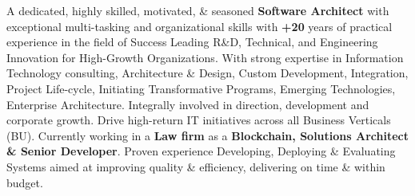\vspace{-4mm}
\begin{cvparagraph}

A dedicated, highly skilled, motivated, \& seasoned \textbf{Software Architect} with exceptional multi-tasking and organizational skills with \textbf{+20} years of practical experience in the field of Success Leading R\&D, Technical, and Engineering Innovation for High-Growth Organizations. With strong expertise in Information Technology consulting, Architecture \& Design, Custom Development, Integration, Project Life-cycle, Initiating Transformative Programs, Emerging Technologies, Enterprise Architecture. Integrally involved in direction, development and corporate growth. Drive high-return IT initiatives across all Business Verticals (BU). Currently working in a \textbf{Law firm} as a \textbf{Blockchain, Solutions Architect \& Senior Developer}. Proven experience Developing, Deploying \& Evaluating Systems aimed at improving quality \& efficiency, delivering on time \& within budget.
\end{cvparagraph}
